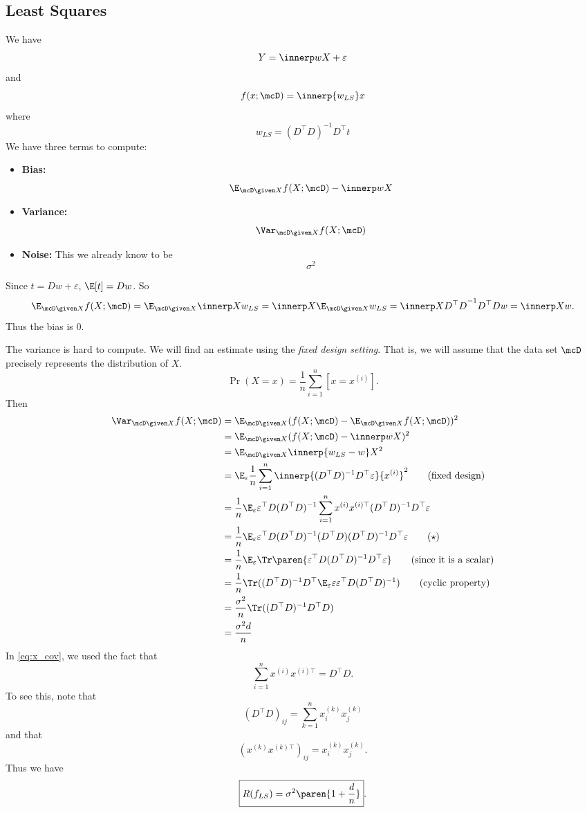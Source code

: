 \subsection{Least Squares} \label{sec:generalization:least_squares}
We have \[
    Y = \innerp w X + \varepsilon
\] and \[
    f(x; \mcD) = \innerp{w_{LS}} x
\] where \[
    w_{LS} = (D^\top D)^{-1} D^\top t
\] We have three terms to compute:
\begin{itemize}
    \item \textbf{Bias:} \[
        \E_{\mcD \given X} f(X; \mcD) - \innerp w X
    \]
    \item \textbf{Variance:} \[
        \Var_{\mcD \given X} f(X; \mcD)
    \]
    \item \textbf{Noise:} This we already know to be \[
        \sigma^2
    \]
\end{itemize}
Since $t = D w + \varepsilon$, $\E[t] = D w$.
So \[
    \E_{\mcD \given X} f(X; \mcD)
        = \E_{\mcD \given X} \innerp X {w_{LS}}
        = \innerp X {\E_{\mcD \given X} w_{LS}}
        = \innerp X {{D^\top D}^{-1} D^\top D w}
        = \innerp X w.
\] Thus the bias is $0$.

The variance is hard to compute.
We will find an estimate using the \emph{fixed design setting}.
That is, we will assume that the data set $\mcD$ precisely represents the
distribution of $X$. \[
    \Pr(X = x) = \frac1n \sum_{i=1}^n [x = x^{(i)}].
\] Then \begin{align*}
    \Var_{\mcD \given X} f(X; \mcD)
    &= \E_{\mcD \given X} (f(X; \mcD) - \E_{\mcD \given X} f(X; \mcD))^2 \\
    &= \E_{\mcD \given X} (f(X; \mcD) - \innerp w X)^2 \\
    &= \E_{\mcD \given X} \innerp{w_{LS} - w} X^2 \\
    &= \E_\varepsilon \frac1n \sum_{i=1}^n \innerp{(D^\top D)^{-1} D^\top \varepsilon}
            {x^{(i)}}^2 \tag{fixed design} \\
    &= \frac1n \E_\varepsilon \varepsilon^\top D (D^\top D)^{-1} \sum_{i=1}^n x^{(i)} x^{(i)\top} (D^\top D)^{-1} D^\top \varepsilon \\
    &= \frac1n \E_\varepsilon \varepsilon^\top D (D^\top D)^{-1} (D^\top D) (D^\top D)^{-1} D^\top \varepsilon \tag{$\star$} \label{eq:x_cov} \\
    &= \frac1n \E_\varepsilon  \Tr\paren{\varepsilon^\top D (D^\top D)^{-1} D^\top \varepsilon}
        \tag{since it is a scalar} \\
    &= \frac1n \Tr((D^\top D)^{-1} D^\top \E_\varepsilon \varepsilon
            \varepsilon^\top D (D^\top D)^{-1}) \tag{cyclic property} \\
    &= \frac{\sigma^2}n \Tr((D^\top D)^{-1} D^\top D) \\
    &= \frac{\sigma^2 d}n
\end{align*}
In \cref{eq:x_cov}, we used the fact that \[
    \sum_{i=1}^n x^{(i)} x^{(i)\top} = D^\top D.
\] To see this, note that \[
    (D^\top D)_{ij} = \sum_{k=1}^n x^{(k)}_i x^{(k)}_j
\] and that \[
    (x^{(k)} x^{(k)\top})_{ij} = x^{(k)}_i x^{(k)}_j.
\]
Thus we have \[
    \boxed{R(f_{LS}) = \sigma^2 \paren{1 + \frac dn}}.
\]
